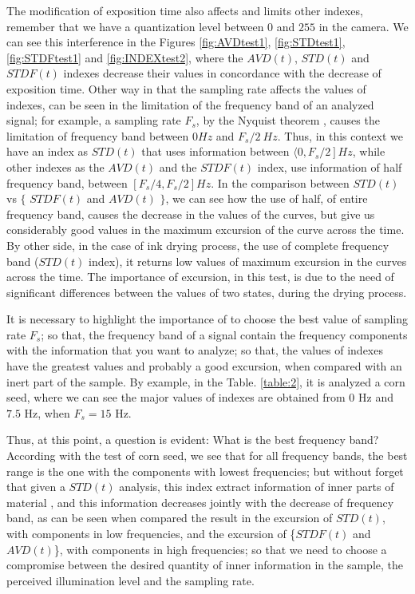 \documentclass[review]{elsarticle}
\begin{document}
The modification of exposition time also affects  and limits other indexes,
remember that we have a quantization level between $0$ and $255$ in the camera. 
We can see this interference in the Figures \ref{fig:AVDtest1}, \ref{fig:STDtest1}, \ref{fig:STDFtest1} and \ref{fig:INDEXtest2}, 
where the $AVD(t)$, $STD(t)$ and $STDF(t)$ indexes decrease their values in concordance with the decrease of exposition time.
Other way in that  the sampling rate affects the values of indexes,
can be seen in the limitation of
the frequency band of an analyzed signal; for example,
a sampling rate $F_s$, by the Nyquist theorem \cite{Nyquist,Shannon}, 
causes  the limitation of  frequency band %
between $0 Hz$ and $F_s/2~Hz$.
Thus, in this context we have an index as $STD(t)$ that uses information between $\langle \left. 0, F_s/2 \right ] Hz$, 
while other  indexes as the $AVD(t)$ and the $STDF(t)$ index, use information of half frequency band, 
between $\left [ F_s/4, F_s/2 \right ] Hz$.
In the comparison between $STD(t)$ vs  $\{$ $STDF(t)$ and $AVD(t)$ $\}$, 
we can see how the use of half, of entire frequency band, causes the decrease in the values of the curves, 
but give us considerably good values in the maximum excursion of the curve across the time. By other side,
in the case of ink drying process, the use of complete frequency band ($STD(t)$ index), 
it returns low values of maximum excursion in the curves across the time. 
The importance of excursion, in this test,
 is due to the need of significant differences between the values of two states,
during the
drying process.

It is necessary to highlight the importance of to choose the best value of sampling rate $F_s$;
so that, 
the frequency band of a signal contain the frequency components with the information that you want to analyze;
so that, the values of indexes have the greatest values and probably a good excursion, 
when compared with an inert part of  the sample. 
By example, in the Table. \ref{table:2}, it is analyzed a corn seed, 
where we can see  the major values of indexes are obtained 
from $0$ Hz and $7.5$ Hz, when $F_s=15$ Hz. 

Thus, at this point,
a question is evident: 
What is the best frequency band? According with the test of corn seed, 
we see that for all frequency bands, 
the best range is the one with the components with lowest frequencies; 
but without forget that given a $STD(t)$ analysis, 
this index extract information of inner parts of material \cite{Nothdurft:05}, 
and this information decreases jointly with the decrease of frequency band,
as can be seen when compared the result in the excursion of $STD(t)$, 
with components in low frequencies,
and the excursion of \{$STDF(t)$ and $AVD(t)$\}, 
with components in high frequencies;
so that we need to choose a compromise between the desired quantity of inner information in the sample, 
the perceived illumination level and the sampling rate.
\end{document}
